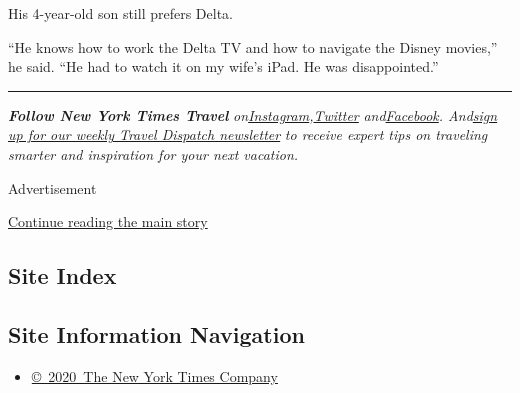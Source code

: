His 4-year-old son still prefers Delta.

``He knows how to work the Delta TV and how to navigate the Disney
movies,'' he said. ``He had to watch it on my wife's iPad. He was
disappointed.''

\begin{center}\rule{0.5\linewidth}{\linethickness}\end{center}

\emph{\textbf{Follow New York Times Travel}}
\emph{on}\href{https://www.instagram.com/nytimestravel/}{\emph{Instagram}}\emph{,}\href{https://twitter.com/nytimestravel}{\emph{Twitter}}
\emph{and}\href{https://www.facebookcorewwwi.onion/nytimestravel/}{\emph{Facebook}}\emph{.
And}\href{https://www.nytimes3xbfgragh.onion/newsletters/traveldispatch}{\emph{sign
up for our weekly Travel Dispatch newsletter}} \emph{to receive expert
tips on traveling smarter and inspiration for your next vacation.}

Advertisement

\protect\hyperlink{after-bottom}{Continue reading the main story}

\hypertarget{site-index}{%
\subsection{Site Index}\label{site-index}}

\hypertarget{site-information-navigation}{%
\subsection{Site Information
Navigation}\label{site-information-navigation}}

\begin{itemize}
\tightlist
\item
  \href{https://help.nytimes3xbfgragh.onion/hc/en-us/articles/115014792127-Copyright-notice}{©~2020~The
  New York Times Company}
\end{itemize}


